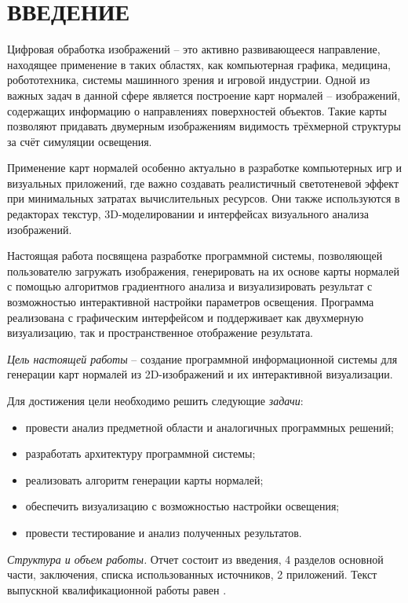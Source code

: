 \section*{ВВЕДЕНИЕ}

Цифровая обработка изображений -- это активно развивающееся направление, находящее применение в таких областях, как компьютерная графика, медицина, робототехника, системы машинного зрения и игровой индустрии. Одной из важных задач в данной сфере является построение карт нормалей -- изображений, содержащих информацию о направлениях поверхностей объектов. Такие карты позволяют придавать двумерным изображениям видимость трёхмерной структуры за счёт симуляции освещения.

Применение карт нормалей особенно актуально в разработке компьютерных игр и визуальных приложений, где важно создавать реалистичный светотеневой эффект при минимальных затратах вычислительных ресурсов. Они также используются в редакторах текстур, 3D-моделировании и интерфейсах визуального анализа изображений.

Настоящая работа посвящена разработке программной системы, позволяющей пользователю загружать изображения, генерировать на их основе карты нормалей с помощью алгоритмов градиентного анализа и визуализировать результат с возможностью интерактивной настройки параметров освещения. Программа реализована с графическим интерфейсом и поддерживает как двухмерную визуализацию, так и пространственное отображение результата.

\emph{Цель настоящей работы} -- создание программной информационной системы для генерации карт нормалей из 2D-изображений и их интерактивной визуализации.

Для достижения цели необходимо решить следующие \emph{задачи}:
\begin{itemize}
	\item провести анализ предметной области и аналогичных программных решений;
	\item разработать архитектуру программной системы;
	\item реализовать алгоритм генерации карты нормалей;
	\item обеспечить визуализацию с возможностью настройки освещения;
	\item провести тестирование и анализ полученных результатов.
\end{itemize}

\emph{Структура и объем работы.} Отчет состоит из введения, 4 разделов основной части, заключения, списка использованных источников, 2 приложений. Текст выпускной квалификационной работы равен .

